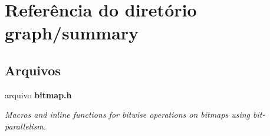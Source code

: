 \section{Referência do diretório graph/summary}
\label{dir_d7d1ea0018b3dbb8f8b95832c825a4db}
\subsection*{Arquivos}
\begin{DoxyCompactItemize}
\item 
arquivo {\bf bitmap.\+h}
\begin{DoxyCompactList}\small\item\em Macros and inline functions for bitwise operations on bitmaps using bit-\/parallelism. \end{DoxyCompactList}\end{DoxyCompactItemize}
